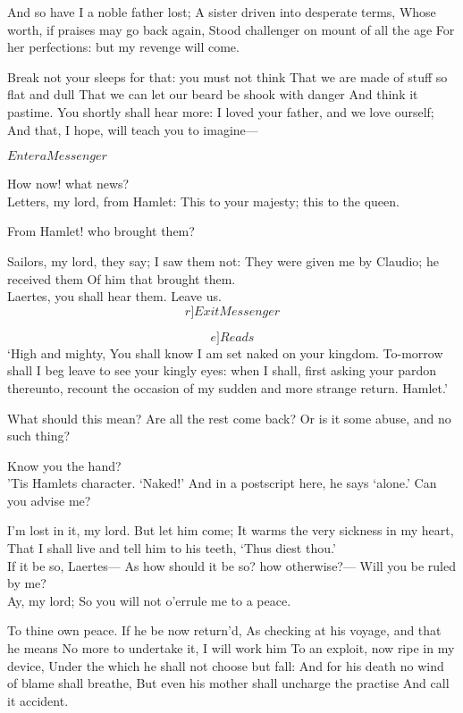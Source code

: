 \documentclass[11pt]{book}
\begin{document}
\7	And so have I a noble father lost;
	A sister driven into desperate terms,
	Whose worth, if praises may go back again,
	Stood challenger on mount of all the age
	For her perfections: but my revenge will come.

\2	Break not your sleeps for that: you must not think
	That we are made of stuff so flat and dull
	That we can let our beard be shook with danger
	And think it pastime. You shortly shall hear more:
	I loved your father, and we love ourself;
	And that, I hope, will teach you to imagine---

	\(Enter a Messenger\)

	How now! what news? \\

	Letters, my lord, from Hamlet:
	This to your majesty; this to the queen.

\2	From Hamlet! who brought them?

	Sailors, my lord, they say; I saw them not:
	They were given me by Claudio; he received them
	Of him that brought them. \\

\2	Laertes, you shall hear them.
   Leave us. \[r]Exit Messenger\]

\Prosa
	\[e]Reads\] `High and mighty, You shall know I am set naked on
	your kingdom. To-morrow shall I beg leave to see
	your kingly eyes: when I shall, first asking your
	pardon thereunto, recount the occasion of my sudden
	and more strange return.                  Hamlet.'
\endProsa

	What should this mean? Are all the rest come back?
	Or is it some abuse, and no such thing?

\7	Know you the hand? \\

\2	'Tis Hamlets character. `Naked!'
	And in a postscript here, he says `alone.'
	Can you advise me?

\7	I'm lost in it, my lord. But let him come;
	It warms the very sickness in my heart,
	That I shall live and tell him to his teeth,
	`Thus diest thou.' \\

\2	If it be so, Laertes---
	As how should it be so? how otherwise?---
	Will you be ruled by me? \\

\7	Ay, my lord;
	So you will not o'errule me to a peace.

\2	To thine own peace. If he be now return'd,
	As checking at his voyage, and that he means
	No more to undertake it, I will work him
	To an exploit, now ripe in my device,
	Under the which he shall not choose but fall:
	And for his death no wind of blame shall breathe,
	But even his mother shall uncharge the practise
	And call it accident. \\
\end{document}
